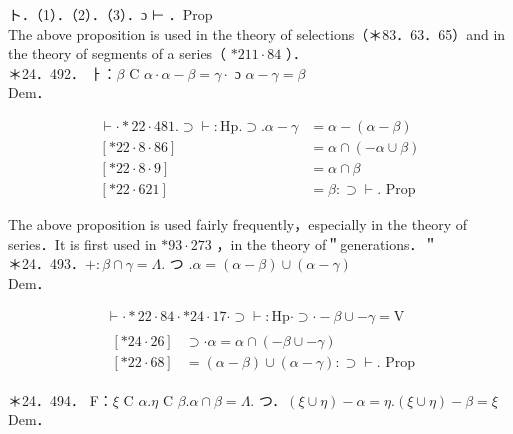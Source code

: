 \documentclass[10pt]{article}
\begin{document}
ト．（1）．（2）．（3）．ɔ ⊢ ．Prop\\
The above proposition is used in the theory of selections（＊83．63．65）and in the theory of segments of a series（ $* 211 \cdot 84$ ）．\\
＊24．492． ㅏ：$\beta$ C $\alpha \cdot \alpha-\beta=\gamma \cdot$ ɔ $\alpha-\gamma=\beta$\\
Dem．

$$
\begin{array}{ll}
\vdash \cdot * 22 \cdot 481 . \supset \vdash: \mathrm{Hp} . \supset . \alpha-\gamma & =\alpha-(\alpha-\beta) \\
{[* 22 \cdot 8 \cdot 86]} & =\alpha \cap(-\alpha \cup \beta) \\
{[* 22 \cdot 8 \cdot 9]} & =\alpha \cap \beta \\
{[* 22 \cdot 621]} & =\beta: \supset \vdash . \text { Prop }
\end{array}
$$

The above proposition is used fairly frequently，especially in the theory of series．It is first used in $* 93 \cdot 273$ ，in the theory of＂generations．＂\\
＊24．493．$+: \beta \cap \gamma=\Lambda$. つ $. \alpha=(\alpha-\beta) \cup(\alpha-\gamma)$\\
Dem．

$$
\begin{aligned}
& \vdash \cdot * 22 \cdot 84 \cdot * 24 \cdot 17 \cdot \supset \vdash: \mathrm{Hp} \cdot \supset \cdot-\beta \cup-\gamma=\mathrm{V} \\
& \begin{array}{lr}
{[* 24 \cdot 26]} & \supset \cdot \alpha=\alpha \cap(-\beta \cup-\gamma) \\
{[* 22 \cdot 68]} & =(\alpha-\beta) \cup(\alpha-\gamma): \supset \vdash . \text { Prop }
\end{array}
\end{aligned}
$$

＊24．494． F：$\xi$ C $\alpha . \eta$ C $\beta . \alpha \cap \beta=\Lambda$. つ．$(\xi \cup \eta)-\alpha=\eta .(\xi \cup \eta)-\beta=\xi$\\
Dem．
\end{document}
